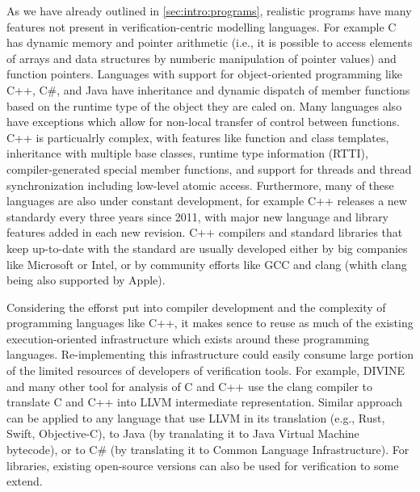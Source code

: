 As we have already outlined in \autoref{sec:intro:programs}, realistic
programs have many features not present in verification-centric modelling
languages.
For example C has dynamic memory and pointer arithmetic (i.e., it is possible
to access elements of arrays and data structures by numberic manipulation of
pointer values) and function pointers.
Languages with support for object-oriented programming like C++, C\#, and Java
have inheritance and dynamic dispatch of member functions based on the runtime
type of the object they are caled on.
Many languages also have exceptions which allow for non-local transfer of
control between functions.
C++ is particualrly complex, with features like function and class
templates,%
inheritance with multiple base classes, runtime type information (RTTI),
compiler-generated special member functions,%
and support for threads and thread synchronization including low-level atomic
access.
Furthermore, many of these languages are also under constant development,
for example C++ releases a new standardy every three years since 2011, with
major new language and library features added in each new revision.
C++ compilers and standard libraries that keep up-to-date with the standard
are usually developed either by big companies like Microsoft or Intel, or by
community efforts like GCC and clang (whith clang being also supported by
Apple).

Considering the efforst put into compiler development and the complexity of
programming languages like C++, it makes sence to reuse as much of the existing
execution-oriented infrastructure which exists around these programming
languages.
Re-implementing this infrastructure could easily consume large portion of the
limited resources of developers of verification tools.
For example, DIVINE and many other tool for analysis of C and C++ use the
clang compiler to translate C and C++ into LLVM intermediate representation.
Similar approach can be applied to any language that use LLVM in its
translation (e.g., Rust, Swift, Objective-C), to Java (by tranalating it to
Java Virtual Machine bytecode), or to C\# (by translating it to Common Language
Infrastructure).
For libraries, existing open-source versions can also be used for verification to some extend.

